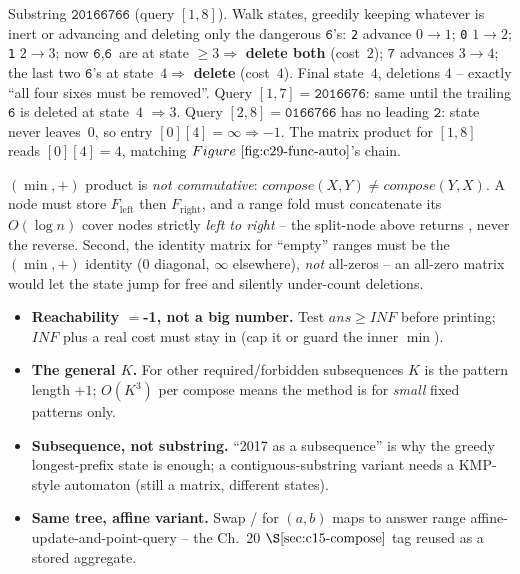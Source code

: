 \begin{tracebox}
Substring \(\texttt{20166766}\) (query \([1,8]\)).  Walk states, greedily keeping
whatever is inert or advancing and deleting only the dangerous \(\texttt{6}\)'s:
\texttt{2} advance \(0\!\to\!1\); \texttt{0} \(1\!\to\!2\); \texttt{1}
\(2\!\to\!3\); now \(\texttt{6},\texttt{6}\) are at state \(\ge3\Rightarrow\)
\textbf{delete both} (cost~\(2\)); \(\texttt{7}\) advances \(3\!\to\!4\); the last
two \(\texttt{6}\)'s at state~\(4\Rightarrow\) \textbf{delete} (cost~\(4\)).  Final
state~\(4\), deletions \(\boxed{4}\) -- exactly ``all four sixes must be removed''.
Query \([1,7]=\texttt{2016676}\): same until the trailing \(\texttt{6}\) is deleted
at state~\(4\) \(\Rightarrow 3\).  Query \([2,8]=\texttt{0166766}\) has no leading
\(\texttt{2}\): state never leaves~\(0\), so entry \([0][4]=\infty\Rightarrow
-1\).  The matrix product for \([1,8]\) reads \([0][4]=4\), matching \(\figref{c29-func-auto}\)'s
chain.
\end{tracebox}

\begin{warningbox}
\((\min,+)\) product is \emph{not commutative}: \(\mathit{compose}(X,Y)\ne
\mathit{compose}(Y,X)\).  A node must store \(F_{\text{left}}\) then
\(F_{\text{right}}\), and a range fold must concatenate its \(O(\log n)\) cover
nodes strictly \emph{left to right} -- the split-node  above returns
, never the reverse.  Second, the identity
matrix for ``empty'' ranges must be the \((\min,+)\) identity (\(0\) diagonal,
\(\infty\) elsewhere), \emph{not} all-zeros -- an all-zero matrix would let the
state jump for free and silently under-count deletions.
\end{warningbox}

\begin{hardeningbox}
\begin{itemize}[nosep,leftmargin=1.4em]
  \item \textbf{Reachability \(=\)-1, not a big number.} Test \(\mathit{ans}\ge
        \mathit{INF}\) before printing; \(\mathit{INF}\) plus a real cost must stay
        in  (cap it or guard the inner \(\min\)).
  \item \textbf{The general \(K\).} For other required/forbidden subsequences
        \(K\) is the pattern length \(+1\); \(O(K^3)\) per compose means the method
        is for \emph{small} fixed patterns only.
  \item \textbf{Subsequence, not substring.} ``2017 as a subsequence'' is why the
        greedy longest-prefix state is enough; a contiguous-substring variant needs
        a KMP-style automaton (still a matrix, different states).
  \item \textbf{Same tree, affine variant.} Swap / for
        \((a,b)\) maps to answer range affine-update-and-point-query -- the
        Ch.~20 \(\secref{c15-compose}\) tag reused as a stored aggregate.
\end{itemize}
\end{hardeningbox}

